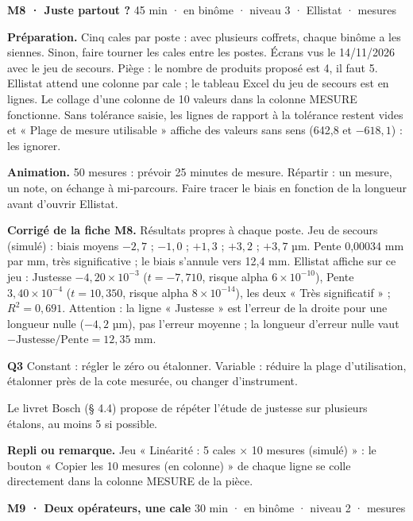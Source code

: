 \vspace{3pt}
\begin{tcolorbox}[act]\textbf{M8 · Juste partout ?} \hfill {\small 45 min · en binôme · niveau 3 · Ellistat · mesures}\end{tcolorbox}
\textbf{Préparation.} Cinq cales par poste : avec plusieurs coffrets, chaque binôme a les siennes. Sinon, faire tourner les cales entre les postes. Écrans vus le 14/11/2026 avec le jeu de secours. Piège : le nombre de produits proposé est 4, il faut 5. Ellistat attend une colonne par cale ; le tableau Excel du jeu de secours est en lignes. Le collage d'une colonne de 10 valeurs dans la colonne MESURE fonctionne. Sans tolérance saisie, les lignes de rapport à la tolérance restent vides et « Plage de mesure utilisable » affiche des valeurs sans sens (642,8 et $-618{,}1$) : les ignorer.\par
\textbf{Animation.} 50 mesures : prévoir 25 minutes de mesure. Répartir : un mesure, un note, on échange à mi-parcours. Faire tracer le biais en fonction de la longueur avant d'ouvrir Ellistat.\par
\textbf{\color{ok}Corrigé de la fiche M8.} Résultats propres à chaque poste. Jeu de secours (simulé) : biais moyens $-2{,}7$ ; $-1{,}0$ ; $+1{,}3$ ; $+3{,}2$ ; $+3{,}7$ µm. Pente 0,00034 mm par mm, très significative ; le biais s'annule vers 12,4 mm. Ellistat affiche sur ce jeu : Justesse $-4{,}20 \times 10^{-3}$ ($t = -7{,}710$, risque alpha $6 \times 10^{-10}$), Pente $3{,}40 \times 10^{-4}$ ($t = 10{,}350$, risque alpha $8 \times 10^{-14}$), les deux « Très significatif » ; $R^2 = 0{,}691$. Attention : la ligne « Justesse » est l'erreur de la droite pour une longueur nulle ($-4{,}2$ µm), pas l'erreur moyenne ; la longueur d'erreur nulle vaut $-\text{Justesse}/\text{Pente} = 12{,}35$ mm.\par \textbf{Q3} Constant : régler le zéro ou étalonner. Variable : réduire la plage d'utilisation, étalonner près de la cote mesurée, ou changer d'instrument.\par Le livret Bosch (§ 4.4) propose de répéter l'étude de justesse sur plusieurs étalons, au moins 5 si possible.\par
{\small\textbf{Repli ou remarque.} Jeu « Linéarité : 5 cales × 10 mesures (simulé) » : le bouton « Copier les 10 mesures (en colonne) » de chaque ligne se colle directement dans la colonne MESURE de la pièce.}\par
\vspace{3pt}
\begin{tcolorbox}[act]\textbf{M9 · Deux opérateurs, une cale} \hfill {\small 30 min · en binôme · niveau 2 · mesures}\end{tcolorbox}
